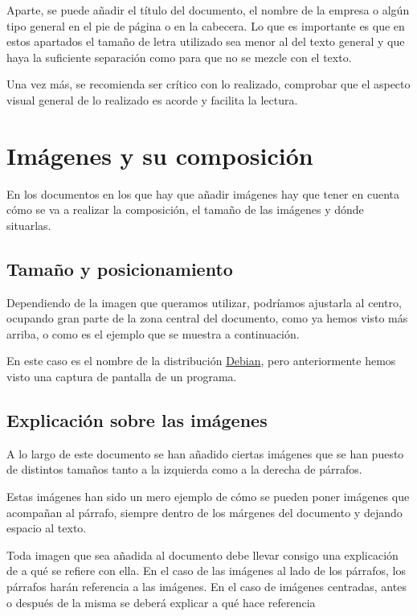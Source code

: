 Aparte, se puede añadir el título del documento, el nombre de la empresa o algún tipo general en el pie de página o en la cabecera. Lo que es importante es que en estos apartados el tamaño de letra utilizado sea menor al del texto general y que haya la suficiente separación como para que no se mezcle con el texto.

Una vez más, se recomienda ser crítico con lo realizado, comprobar que el aspecto visual general de lo realizado es acorde y facilita la lectura.


\section{Imágenes y su composición}

En los documentos en los que hay que añadir imágenes hay que tener en cuenta cómo se va a realizar la composición, el tamaño de las imágenes y dónde situarlas.

\subsection{Tamaño y posicionamiento}
Dependiendo de la imagen que queramos utilizar, podríamos ajustarla al centro, ocupando gran parte de la zona central del documento, como ya hemos visto más arriba, o como es el ejemplo que se muestra a continuación.

\begin{center}
    
\end{center}

En este caso es el nombre de la distribución \href{https://www.debian.org/}{Debian}, pero anteriormente hemos visto una captura de pantalla de un programa.

\subsection{Explicación sobre las imágenes}
A lo largo de este documento se han añadido ciertas imágenes que se han puesto de distintos tamaños tanto a la izquierda como a la derecha de párrafos.

Estas imágenes han sido un mero ejemplo de cómo se pueden poner imágenes que acompañan al párrafo, siempre dentro de los márgenes del documento y dejando espacio al texto.

Toda imagen que sea añadida al documento debe llevar consigo una explicación de a qué se refiere con ella. En el caso de las imágenes al lado de los párrafos, los párrafos harán referencia a las imágenes. En el caso de imágenes centradas, antes o después de la misma se deberá explicar a qué hace referencia


